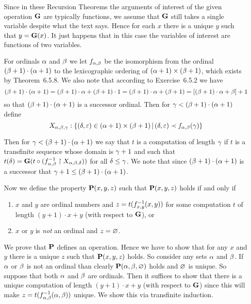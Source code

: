 \begin{solution}
    \def\P{\prop{P}}
    \def\G{\prop{G}}
    \def\R{\prop{R}}
    \def\F{\prop{F}}
    Since in these Recursion Theorems the arguments of interest of the given operation $\G$ are typically functions, we assume that $\G$ still takes a single variable despite what the text says.
    Hence for each $x$ there is a unique $y$ such that $y = \G(x)$.
    It just happens that in this case the variables of interest are functions of two variables.

    For ordinals $\alpha$ and $\beta$ we let $f_{\alpha,\beta}$ be the isomorphism from the ordinal $(\beta+1)\cdot(\alpha+1)$ to the lexicographic ordering of $(\alpha+1) \times (\beta+1)$, which exists by Theorem~6.5.8.
    We also note that  according to Exercise~6.5.2 we have
    $$
    (\beta+1)\cdot(\alpha+1) = (\beta+1)\cdot\alpha + (\beta+1)\cdot 1 = (\beta+1)\cdot\alpha + (\beta+1) = \left[ (\beta+1)\cdot\alpha + \beta \right] + 1
    $$
    so that $(\beta+1)\cdot(\alpha+1)$ is a successor ordinal.
    Then for $\gamma < (\beta+1)\cdot(\alpha+1)$ define
    $$
    X_{\alpha,\beta,\gamma} : \left\{ (\delta,\varepsilon) \in (\alpha+1) \times (\beta+1) \,|\, (\delta,\varepsilon) \prec f_{\alpha,\beta}(\gamma) \right\}
    $$

    Then for $\gamma < (\beta+1) \cdot (\alpha+1)$ we say that $t$ is a computation of length $\gamma$ if $t$ is a transfinite sequence whose domain is $\gamma+1$ and such that $t(\d) = \G(t \circ (\inv{f_{\a,\b}} \rest X_{\a,\b,\d}))$ for all $\delta \leq \gamma$.
    We note that since $(\beta+1)\cdot(\alpha+1)$ is a successor that $\gamma+1 \leq (\beta+1)\cdot(\alpha+1)$.

    Now we define the property $\P(x,y,z)$ such that $\P(x,y,z)$ holds if and only if
    \begin{enumerate}
        \item $x$ and $y$ are ordinal numbers and $z = t(f_{x,y}^{-1}(x,y))$ for some computation $t$ of length $(y+1)\cdot x + y$ (with respect to $\G$), or
        \item $x$ or $y$ is \emph{not} an ordinal and $z = \varnothing$.
    \end{enumerate}

    We prove that $\P$ defines an operation.
    Hence we have to show that  for any $x$ and $y$ there is a unique $z$ such that $\P(x,y,z)$ holds.
    So consider any sets $\alpha$ and $\beta$.
    If $\alpha$ or $\beta$ is not an ordinal than clearly $\P(\a,\b,\es)$ holds and $\varnothing$ is unique.
    So suppose that both $\alpha$ and $\beta$ are ordinals.
    Then it suffices to show that there is a unique computation of length $(y+1)\cdot x + y$ (with respect to $\G$) since this will make $z = t(f_{\alpha,\beta}^{-1}(\alpha,\beta))$ unique.
    We show this via transfinite induction.


\end{solution}
